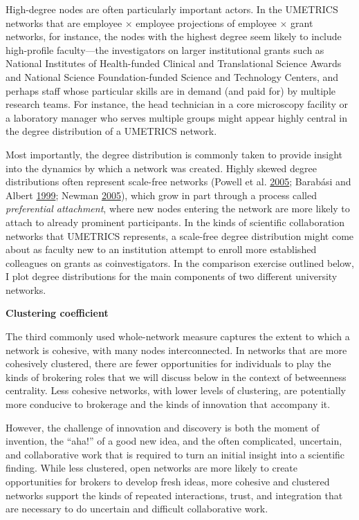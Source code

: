 \documentclass[]{krantz}
\begin{document}
High-degree nodes are often particularly important actors. In the
UMETRICS networks that are employee \(\times\) employee projections of
employee \(\times\) grant networks, for instance, the nodes with the
highest degree seem likely to include high-profile faculty---the
investigators on larger institutional grants such as National Institutes
of Health-funded Clinical and Translational Science Awards and National
Science Foundation-funded Science and Technology Centers, and perhaps
staff whose particular skills are in demand (and paid for) by multiple
research teams. For instance, the head technician in a core microscopy
facility or a laboratory manager who serves multiple groups might appear
highly central in the degree distribution of a UMETRICS network.

Most importantly, the degree distribution is commonly taken to provide
insight into the dynamics by which a network was created. Highly skewed
degree distributions often represent scale-free networks (Powell et al.
\protect\hyperlink{ref-powell2005network}{2005}; Barabási and Albert
\protect\hyperlink{ref-barabasi1999emergence}{1999}; Newman
\protect\hyperlink{ref-newman2005measure}{2005}), which grow in part
through a process called \emph{preferential attachment}, where new nodes
entering the network are more likely to attach to already prominent
participants. In the kinds of scientific collaboration networks that
UMETRICS represents, a scale-free degree distribution might come about
as faculty new to an institution attempt to enroll more established
colleagues on grants as coinvestigators. In the comparison exercise
outlined below, I plot degree distributions for the main components of
two different university networks.

\textbf{Clustering coefficient}

The third commonly used whole-network measure captures the extent to
which a network is cohesive, with many nodes interconnected. In networks
that are more cohesively clustered, there are fewer opportunities for
individuals to play the kinds of brokering roles that we will discuss
below in the context of betweenness centrality. Less cohesive networks,
with lower levels of clustering, are potentially more conducive to
brokerage and the kinds of innovation that accompany it.

However, the challenge of innovation and discovery is both the moment of
invention, the ``aha!'' of a good new idea, and the often complicated,
uncertain, and collaborative work that is required to turn an initial
insight into a scientific finding. While less clustered, open networks
are more likely to create opportunities for brokers to develop fresh
ideas, more cohesive and clustered networks support the kinds of
repeated interactions, trust, and integration that are necessary to do
uncertain and difficult collaborative work.
\end{document}
